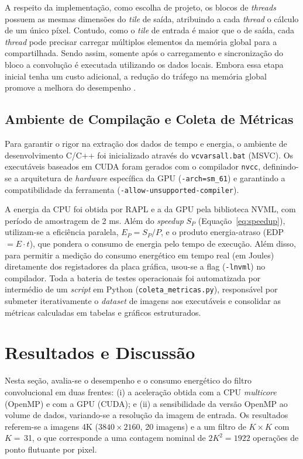 \documentclass[12pt]{article}
\begin{document}
A respeito da implementação, como escolha de projeto, os blocos de \emph{threads} possuem as mesmas dimensões do \emph{tile} de saída, atribuindo a cada \emph{thread} o cálculo de um único píxel. Contudo, como o \emph{tile} de entrada é maior que o de saída, cada \emph{thread} pode precisar carregar múltiplos elementos da memória global para a compartilhada. Sendo assim, somente após o carregamento e sincronização do bloco a convolução é executada utilizando os dados locais. Embora essa etapa inicial tenha um custo adicional, a redução do tráfego na memória global promove a melhora do desempenho \cite{hwu2023}.

\subsection{Ambiente de Compilação e Coleta de Métricas}

Para garantir o rigor na extração dos dados de tempo e energia, o ambiente de desenvolvimento C/C++ foi inicializado através do \texttt{vcvarsall.bat} (MSVC). Os executáveis baseados em CUDA foram gerados com o compilador \texttt{nvcc}, definindo-se a arquitetura de \textit{hardware} específica da GPU (\texttt{-arch=sm\_61}) e garantindo a compatibilidade da ferramenta (\texttt{-allow-unsupported-compiler}). 

A energia da CPU foi obtida por RAPL e a da GPU pela biblioteca NVML, com período de amostragem de 2 ms. Além do \textit{speedup} $S_P$ (Equação~\ref{eq:speedup}), utilizam-se a eficiência paralela, $E_P = S_P/P$, e o produto energia-atraso (EDP $= E\cdot t$), que pondera o consumo de energia pelo tempo de execução. Além disso, para permitir a medição do consumo energético em tempo real (em Joules) diretamente dos registadores da placa gráfica, usou-se a flag (\texttt{-lnvml}) no compilador. Toda a bateria de testes operacionais foi automatizada por intermédio de um \textit{script} em Python (\texttt{coleta\_metricas.py}), responsável por submeter iterativamente o \textit{dataset} de imagens aos executáveis e consolidar as métricas calculadas em tabelas e gráficos estruturados.

\section{Resultados e Discussão}
\label{sec:resultados}

Nesta seção, avalia-se o desempenho e o consumo energético do filtro convolucional em duas frentes: (i) a aceleração obtida com a CPU \textit{multicore} (OpenMP) e com a GPU (CUDA); e (ii) a sensibilidade da versão OpenMP ao volume de dados, variando-se a resolução da imagem de entrada. Os resultados referem-se a imagens 4K ($3840\times2160$, 20 imagens) e a um filtro de $K\times K$ com $K=$\,31, o que corresponde a uma contagem nominal de $2K^2 = 1922$ operações de ponto flutuante por pixel.
\end{document}
